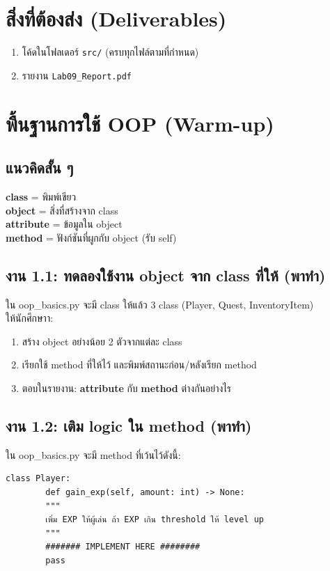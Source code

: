 \documentclass[12pt,a4paper]{article}
\newcommand{\code}[1]{\texttt{#1}}
\begin{document}
	\section*{สิ่งที่ต้องส่ง (Deliverables)}
	\begin{enumerate}[label=\arabic*.]
		\item โค้ดในโฟลเดอร์ \code{src/} (ครบทุกไฟล์ตามที่กำหนด)
		\item รายงาน \code{Lab09\_Report.pdf}
	\end{enumerate}
	
	
	\section{พื้นฐานการใช้ OOP (Warm-up)}
	\subsection*{แนวคิดสั้น ๆ}
	\textbf{class} = พิมพ์เขียว \\
	\textbf{object} = สิ่งที่สร้างจาก class \\
	\textbf{attribute} = ข้อมูลใน object \\
	\textbf{method} = ฟังก์ชันที่ผูกกับ object (รับ {self})
	
	\subsection*{งาน 1.1: ทดลองใช้งาน object จาก class ที่ให้ (พาทำ)}
	ใน {oop\_basics.py} จะมี class ให้แล้ว 3 class ({Player}, {Quest}, {InventoryItem})\\
	ให้นักศึกษาา:
	\begin{enumerate}[label=\arabic*.]
		\item สร้าง object อย่างน้อย 2 ตัวจากแต่ละ class
		\item เรียกใช้ method ที่ให้ไว้ และพิมพ์สถานะก่อน/หลังเรียก method
		\item ตอบในรายงาน: \textbf{attribute} กับ \textbf{method} ต่างกันอย่างไร
	\end{enumerate}
	
	\subsection*{งาน 1.2: เติม logic ใน method (พาทำ)}
	ใน {oop\_basics.py} จะมี method ที่เว้นไว้ดังนี้:
	\begin{lstlisting}[style=py]
	class Player:
		def gain_exp(self, amount: int) -> None:
		"""
		เพิ่ม EXP ให้ผู้เล่น ถ้า EXP เกิน threshold ให้ level up
		"""
		####### IMPLEMENT HERE ########
		pass
	\end{lstlisting}
	
\end{document}
